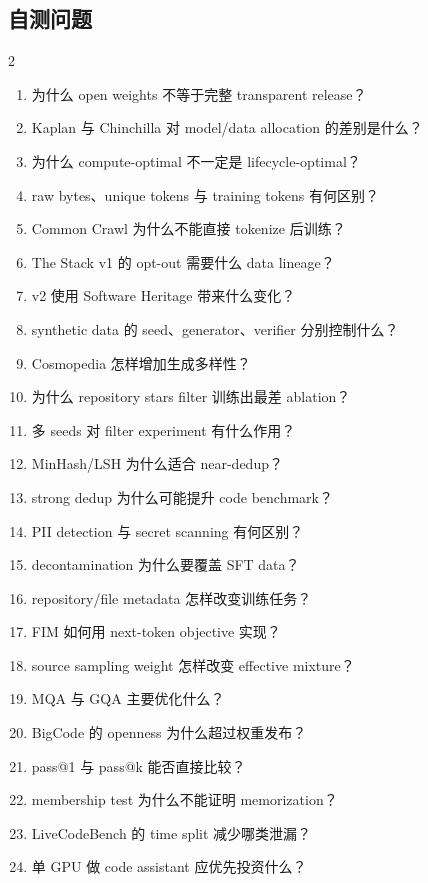 \subsection{自测问题}

\begin{multicols}{2}
\footnotesize
\begin{enumerate}
  \setlength{\itemsep}{0pt}
  \item 为什么 open weights 不等于完整 transparent release？
  \item Kaplan 与 Chinchilla 对 model/data allocation 的差别是什么？
  \item 为什么 compute-optimal 不一定是 lifecycle-optimal？
  \item raw bytes、unique tokens 与 training tokens 有何区别？
  \item Common Crawl 为什么不能直接 tokenize 后训练？
  \item The Stack v1 的 opt-out 需要什么 data lineage？
  \item v2 使用 Software Heritage 带来什么变化？
  \item synthetic data 的 seed、generator、verifier 分别控制什么？
  \item Cosmopedia 怎样增加生成多样性？
  \item 为什么 repository stars filter 训练出最差 ablation？
  \item 多 seeds 对 filter experiment 有什么作用？
  \item MinHash/LSH 为什么适合 near-dedup？
  \item strong dedup 为什么可能提升 code benchmark？
  \item PII detection 与 secret scanning 有何区别？
  \item decontamination 为什么要覆盖 SFT data？
  \item repository/file metadata 怎样改变训练任务？
  \item FIM 如何用 next-token objective 实现？
  \item source sampling weight 怎样改变 effective mixture？
  \item MQA 与 GQA 主要优化什么？
  \item BigCode 的 openness 为什么超过权重发布？
  \item pass@1 与 pass@k 能否直接比较？
  \item membership test 为什么不能证明 memorization？
  \item LiveCodeBench 的 time split 减少哪类泄漏？
  \item 单 GPU 做 code assistant 应优先投资什么？
\end{enumerate}
\end{multicols}

